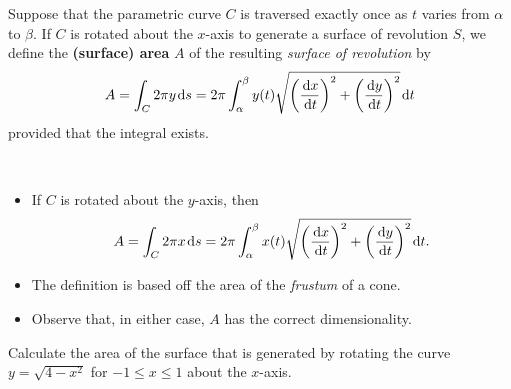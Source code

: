 \begin{definition}
Suppose that the parametric curve $C$ is traversed exactly once as $t$ varies from $\alpha$ to $\beta$.
If $C$ is rotated about the $x$-axis to generate a surface of revolution $S$, we define the \textbf{(surface) area} $A$ of the resulting \textit{surface of revolution} by
\begin{equation*}
A = \int_C 2\pi y\mkern 2mu \mathrm{d} s =2\pi \int_\alpha^\beta y(t)\sqrt{\left(\frac{\mkern 2mu \mathrm{d} x}{\mkern 2mu \mathrm{d} t}\right)^2 + \left(\frac{\mkern 2mu \mathrm{d} y}{\mkern 2mu \mathrm{d} t}\right)^2}\mkern 2mu \mathrm{d} t
\end{equation*}
provided that the integral exists.
\end{definition}

\begin{remark}\,
\begin{itemize}
\item If $C$ is rotated about the $y$-axis, then 
\begin{equation*}
A = \int_C 2\pi x\mkern 2mu \mathrm{d} s =2\pi \int_\alpha^\beta x(t)\sqrt{\left(\frac{\mkern 2mu \mathrm{d} x}{\mkern 2mu \mathrm{d} t}\right)^2 + \left(\frac{\mkern 2mu \mathrm{d} y}{\mkern 2mu \mathrm{d} t}\right)^2}\mkern 2mu \mathrm{d} t.
\end{equation*}
\item The definition is based off the area of the \textit{frustum} of a cone.
\item Observe that, in either case, $A$ has the correct dimensionality.
\end{itemize}
\end{remark}

\newpage

\begin{example}
Calculate the area of the surface that is generated by rotating the curve $y=\sqrt{4-x^2}$ for $-1\le x\le 1$ about the $x$-axis.
\end{example}
\ifdefined\SOLUTION
{}
\else
\fi
\newpage

